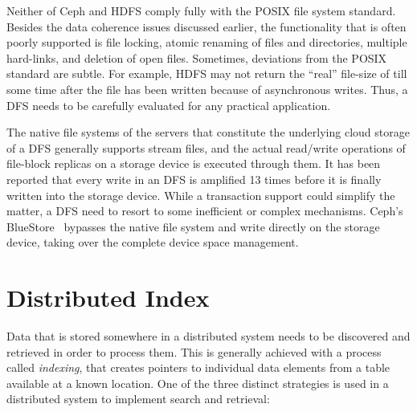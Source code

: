 Neither of Ceph and HDFS comply fully with the POSIX file system standard. Besides the
data coherence issues discussed earlier, the functionality that is often poorly supported is file locking, atomic renaming of files and 
directories, multiple hard-links, and deletion of open files. Sometimes, deviations from the POSIX standard are subtle. For example, 
HDFS may not return the ``real'' file-size of till some time after the file has been written because of asynchronous writes. Thus,
a DFS needs to be carefully evaluated for any practical application.

The native file systems of the servers that constitute the underlying cloud storage of a DFS generally supports stream files,
and the actual read/write operations of file-block replicas on a storage device is executed through them. It has been reported
that every write in an DFS is amplified 13 times before it is finally written into the storage device. While a transaction
support could simplify the matter, a DFS need to resort to some inefficient or complex mechanisms. Ceph's BlueStore~\citep{Aghayev:2020} 
bypasses the native file system and write directly on the storage device, taking over the complete device space management.

\section{Distributed Index}

Data that is stored somewhere in a distributed system needs to be discovered and retrieved in order to process them. This is
generally achieved with a process called {\em indexing}, that creates pointers to individual data elements from a table available
at a known location. One of the three distinct strategies is used in a distributed system to implement search and retrieval:

